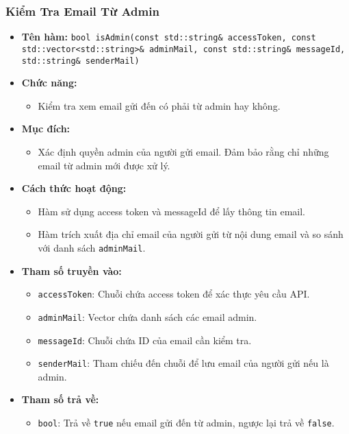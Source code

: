 \subsubsection{Kiểm Tra Email Từ Admin}
\begin{itemize}
    \item \textbf{Tên hàm:} \texttt{bool isAdmin(const std::string\& accessToken, const std::vector<std::string>\& adminMail, const std::string\& messageId, std::string\& senderMail)}
    \item \textbf{Chức năng:} 
    \begin{itemize}
        \item Kiểm tra xem email gửi đến có phải từ admin hay không.
    \end{itemize}
    \item \textbf{Mục đích:} 
    \begin{itemize}
        \item Xác định quyền admin của người gửi email. Đảm bảo rằng chỉ những email từ admin mới được xử lý.
    \end{itemize}
    \item \textbf{Cách thức hoạt động:} 
    \begin{itemize}
        \item Hàm sử dụng access token và messageId để lấy thông tin email.
        \item Hàm trích xuất địa chỉ email của người gửi từ nội dung email và so sánh với danh sách \texttt{adminMail}.
    \end{itemize}
    \item \textbf{Tham số truyền vào:} 
    \begin{itemize}
        \item \texttt{accessToken}: Chuỗi chứa access token để xác thực yêu cầu API.
        \item \texttt{adminMail}: Vector chứa danh sách các email admin.
        \item \texttt{messageId}: Chuỗi chứa ID của email cần kiểm tra.
        \item \texttt{senderMail}: Tham chiếu đến chuỗi để lưu email của người gửi nếu là admin.
    \end{itemize}
    \item \textbf{Tham số trả về:} 
    \begin{itemize}
        \item \texttt{bool}: Trả về \texttt{true} nếu email gửi đến từ admin, ngược lại trả về \texttt{false}.
    \end{itemize}
\end{itemize}

